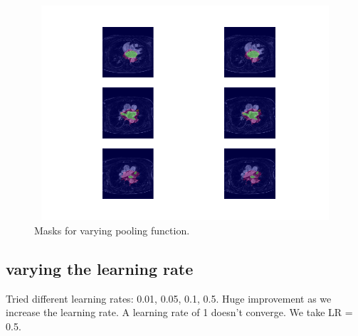 \begin{figure}
\centering
\includegraphics[trim=2.5cm 1.5cm 2cm 1.5cm, clip=true, height=80mm, width=150mm]{Chapter3/mask_results_varying_pooling_function.png}
\caption{Masks for varying pooling function.}
\end{figure}

\subsection{varying the learning rate}

\noindent Tried different learning rates: 0.01, 0.05, 0.1, 0.5. Huge improvement as we increase the learning rate. A learning rate of 1 doesn't converge. We take LR = 0.5.

